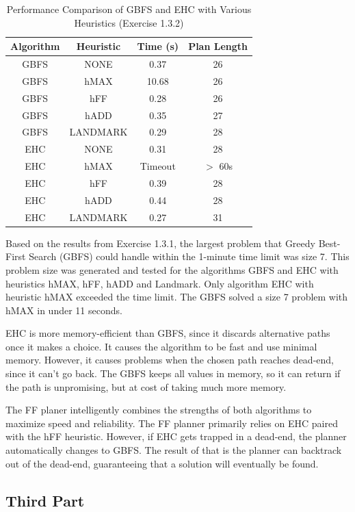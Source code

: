 \documentclass{article}
\begin{document}
\begin{table}[H]
\centering
\begin{tabular}{|c|c|c|c|}
\hline
\textbf{Algorithm} & \textbf{Heuristic} & \textbf{Time (s)} & \textbf{Plan Length} \\ \hline
GBFS & NONE & 0.37 & 26\\ \hline
GBFS & hMAX & 10.68 & 26 \\ \hline
GBFS & hFF & 0.28 & 26 \\ \hline
GBFS & hADD & 0.35 & 27 \\ \hline
GBFS & LANDMARK & 0.29 & 28 \\ \hline
EHC & NONE & 0.31 & 28 \\ \hline
EHC & hMAX & Timeout & $>$ 60s \\ \hline
EHC & hFF & 0.39 & 28 \\ \hline
EHC & hADD & 0.44 & 28 \\ \hline
EHC & LANDMARK & 0.27 & 31 \\ \hline
\end{tabular}
\caption{Performance Comparison of GBFS and EHC with Various Heuristics (Exercise 1.3.2)}
\label{tab:results_1_3_2}
\end{table}
Based on the results from Exercise 1.3.1, the largest problem that Greedy Best-First Search (GBFS) could handle within the 1-minute time limit was size 7. This problem size was generated and tested for the algorithms GBFS and EHC with heuristics hMAX, hFF, hADD and Landmark. Only algorithm EHC with heuristic hMAX exceeded the time limit. The GBFS solved a size 7 problem with hMAX in under 11 seconds.

EHC is more memory-efficient than GBFS, since it discards alternative paths once it makes a choice. It causes the algorithm to be fast and use minimal memory. However, it causes problems when the chosen path reaches dead-end, since it can't go back. The GBFS keeps all values in memory, so it can return if the path is unpromising, but at cost of taking much more memory.

The FF planer intelligently combines the strengths of both algorithms to maximize speed and reliability.
The FF planner primarily relies on EHC paired with the hFF heuristic. However, if EHC gets trapped in a dead-end, the planner automatically changes to GBFS. The result of that is the planner can backtrack out of the dead-end, guaranteeing that a solution will eventually be found.


\subsection{Third Part}
\end{document}

